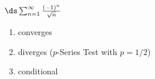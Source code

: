 {$\ds \sum_{n=1}^\infty \frac{(-1)^n}{\sqrt{n}}$
}
{\begin{enumerate}
	\item converges
	\item	diverges ($p$-Series Test with $p=1/2$)
	\item conditional
\end{enumerate}
}